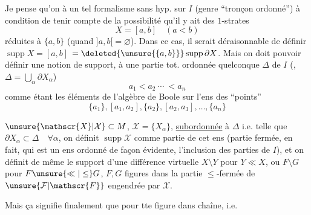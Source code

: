 
Je pense qu'on  à un tel formalisme sans hyp. sur $I$ (genre ``tronçon ordonné'') à condition de tenir compte de la possibilité qu'il y ait des $1$-strates
\[
X=[a,b]\quad(a<b)
\]
réduites à $\{a,b\}$ (quand $]a,b[=\varnothing$). Dans ce cas, il serait déraisonnable de définir $\operatorname{supp}X=[a,b]$  $=\deleted{\unsure{\{a,b\}}}\operatorname{supp}\partial X$. Mais on doit pouvoir définir une notion de support,  à une partie tot. ordonnée quelconque $\Delta$ de $I$ (, $\Delta=\bigcup_\alpha\partial X_\alpha$)
\[
a_1<a_2\ \cdots\ <a_n
\]
comme étant  les éléments de l'algèbre de Boole sur l'ens des ``points''
\[
\{a_1\},[a_1,a_2],\{a_2\},[a_2,a_3],\ldots,\{a_n\}
\]

 $\unsure{\mathscr{X}|\mathcal{X}}\subset M$, $\mathscr{X}=\{X_\alpha\}$, \uline{subordonnée} à $\Delta$ i.e. telle que $\partial X_\alpha\subset\Delta\quad\forall\alpha$, on définit $\operatorname{supp}\mathscr{X}$ comme partie de cet ens (partie fermée, en fait, qui est un ens ordonné de façon évidente\unsure{\}|)},  l'inclusion des  parties de $I$), et on définit de même le support d'une différence virtuelle $X\setminus Y$ pour $Y\ll X$, ou $F\setminus G$ pour $F\unsure{\ll|\leq}G$, $F,G$ figures dans la  partie $\leq$-fermée de $\unsure{\mathcal{F}|\mathscr{F}}$ engendrée par $\mathscr{X}$.

Mais ça signifie finalement que pour tte figure dans  chaîne, i.e.
